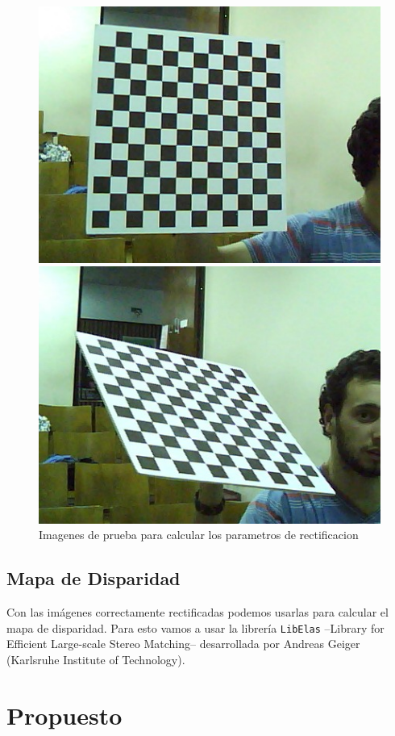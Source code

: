 \documentclass[journal,a4paper]{IEEEtran}
\begin{document}
\begin{figure}[h!]
    \centering
    \includegraphics[width=0.8\linewidth]{calibracion1.jpg}
    
    \medskip
    
    \includegraphics[width=0.8\linewidth]{calibracion2.jpg}
    \caption{Imagenes de prueba para calcular los parametros de rectificacion}
    \label{fig_calibracion}
\end{figure}

\subsection{Mapa de Disparidad}
Con las imágenes correctamente rectificadas podemos usarlas para calcular el mapa de disparidad.
Para esto vamos a usar la librería \texttt{LibElas} --Library for Efficient Large-scale Stereo Matching-- desarrollada por Andreas Geiger (Karlsruhe Institute of Technology).


\section{Propuesto}
\end{document}
